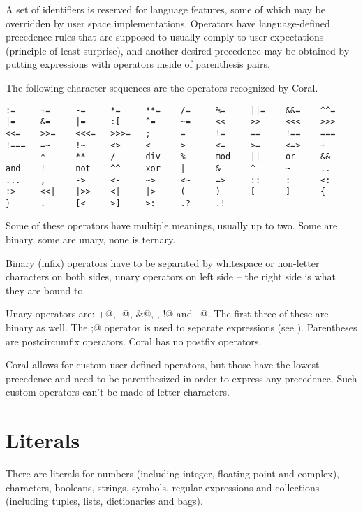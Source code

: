 A set of identifiers is reserved for language features, some of which may be overridden by user space implementations. Operators have language-defined precedence rules that are supposed to usually comply to user expectations (principle of least surprise), and another desired precedence may be obtained by putting expressions with operators inside of parenthesis pairs. 

The following character sequences are the operators recognized by Coral. 

\begin{lstlisting}
:=     +=     -=     *=     **=    /=     %=     ||=    &&=    ^^= 
|=     &=     |=     :[     ^=     ~=     <<     >>     <<<    >>> 
<<=    >>=    <<<=   >>>=   ;      =      !=     ==     !==    === 
!===   =~     !~     <>     <      >      <=     >=     <=>    + 
-      *      **     /      div    %      mod    ||     or     && 
and    !      not    ^^     xor    |      &      ^      ~      .. 
...    ,      ->     <-     ~>     <~     =>     ::     :      <: 
:>     <<|    |>>    <|     |>     (      )      [      ]      { 
}      .      [<     >]     >:     .?     .!
\end{lstlisting}

Some of these operators have multiple meanings, usually up to two. Some are binary, some are unary, none is ternary. 

Binary (infix) operators have to be separated by whitespace or non-letter characters on both sides, unary operators on left side – the right side is what they are bound to. 

Unary operators are: \lstinline@+@, \lstinline@-@, \lstinline@&@, \lstinline@not@, \lstinline@!@ and \lstinline@~@. The first three of these are binary as well. The \lstinline@;@ operator is used to separate expressions (see ). Parentheses are postcircumfix operators. Coral has no postfix operators. 

Coral allows for custom user-defined operators, but those have the lowest precedence and need to be parenthesized in order to express any precedence. Such custom operators can't be made of letter characters. 

\section{Literals}\label{sec:literals}

There are literals for numbers (including integer, floating point and complex), characters, booleans, strings, symbols, regular expressions and collections (including tuples, lists, dictionaries and bags). 

